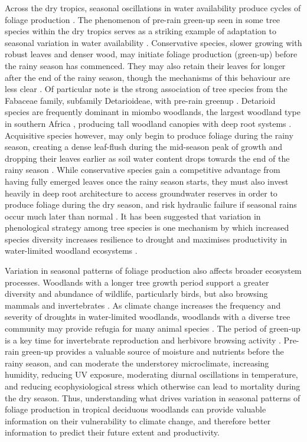 \documentclass[11pt,a4paper]{article}
\begin{document}
Across the dry tropics, seasonal oscillations in water availability produce cycles of foliage production \citep{Chidumayo2001, Dahlin2016}. The phenomenon of pre-rain green-up seen in some tree species within the dry tropics serves as a striking example of adaptation to seasonal variation in water availability \citep{Ryan2017}. Conservative species, slower growing with robust leaves and denser wood, may initiate foliage production (green-up) before the rainy season has commenced. They may also retain their leaves for longer after the end of the rainy season, though the mechanisms of this behaviour are less clear \citep{}. Of particular note is the strong association of tree species from the Fabaceae family, subfamily Detarioideae, with pre-rain greenup \citep{Ryan2017}. Detarioid species are frequently dominant in miombo woodlands, the largest woodland type in southern Africa \citep{White1983}, producing tall woodland canopies with deep root systems \citep{Zhou2020}. Acquisitive species however, may only begin to produce foliage during the rainy season, creating a dense leaf-flush during the mid-season peak of growth and dropping their leaves earlier as soil water content drops towards the end of the rainy season \citep{Lasky2016}. While conservative species gain a competitive advantage from having fully emerged leaves once the rainy season starts, they must also invest heavily in deep root architecture to access groundwater reserves in order to produce foliage during the dry season, and risk hydraulic failure if seasonal rains occur much later than normal \citep{}. It has been suggested that variation in phenological strategy among tree species is one mechanism by which increased species diversity increases resilience to drought and maximises productivity in water-limited woodland ecosystems \citep{Stan2019, Morellato2016}. 

Variation in seasonal patterns of foliage production also affects broader ecosystem processes. Woodlands with a longer tree growth period support a greater diversity and abundance of wildlife, particularly birds, but also browsing mammals and invertebrates \citep{Cole2015, Araujo2017, Morellato2016, Ogutu2013}. As climate change increases the frequency and severity of droughts in water-limited woodlands, woodlands with a diverse tree community may provide refugia for many animal species \citep{Bale2002}. The period of green-up is a key time for invertebrate reproduction \citep{Prather2012} and herbivore browsing activity \citep{Velasque2016, Morellato2016}. Pre-rain green-up provides a valuable source of moisture and nutrients before the rainy season, and can moderate the understorey microclimate, increasing humidity, reducing UV exposure, moderating diurnal oscillations in temperature, and reducing ecophysiological stress which otherwise can lead to mortality during the dry season. Thus, understanding what drives variation in seasonal patterns of foliage production in tropical deciduous woodlands can provide valuable information on their vulnerability to climate change, and therefore better information to predict their future extent and productivity.
 
\end{document}
